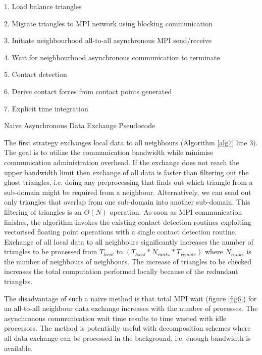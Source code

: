 \documentclass[times,12pt]{article}
\begin{document}
\begin{algorithm}
1. Load balance triangles

2. Migrate triangles to MPI network using blocking communication

3. Initiate neighbourhood all-to-all asynchronous MPI send/receive

4. Wait for neighbourhood asynchronous communication to terminate

5. Contact detection 

6. Derive contact forces from contact points generated

7. Explicit time integration

\protect\caption{\label{alg7}Naive Asynchronous Data Exchange Pseudocode}
\end{algorithm}

The first strategy exchanges local data to all neighbours (Algorithm \ref{alg7} line 3).  The goal is to utilize the communication bandwidth while minimise communication administration
overhead. If the exchange does not reach the upper bandwidth limit then exchange of all data is faster than filtering out the ghost triangles, i.e. doing any preprocessing that finds out which triangle from a sub-domain might be required from a neighbour. Alternatively, we can send out only triangles
that overlap from one sub-domain into another sub-domain. This filtering of triangles is an $O(N)$ operation. As soon as MPI communication finishes, the algorithm invokes the existing contact
detection routines exploiting vectorised floating point operations with a single contact detection routine. Exchange of all local data to all neighbours significantly increases the number of triangles to be processed from $T_{local}$ to $(T_{local} * N_{ranks} * T_{remote})$ where $N_{ranks}$ is the number of neighbours of neighbours. The increase of triangles to be checked increases the total computation performed locally because of the redundant triangles.

The disadvantage of such a naive method is that total MPI wait (figure \ref{fig6}) for an all-to-all neighbour data exchange increases with the number of processes. The asynchronous communication wait time results to time wasted with idle processors. The method is potentially useful with decomposition schemes where all data exchange can be processed in the background, i.e. enough bandwidth is available.
\end{document}
